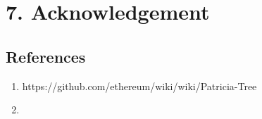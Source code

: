 \hypertarget{acknowledgement}{%
\section{7. Acknowledgement}\label{acknowledgement}}

\hypertarget{references}{%
\subsection{References}\label{references}}

\begin{enumerate}
\def\labelenumi{\arabic{enumi}.}
\item
  https://github.com/ethereum/wiki/wiki/Patricia-Tree
\item
\end{enumerate}

